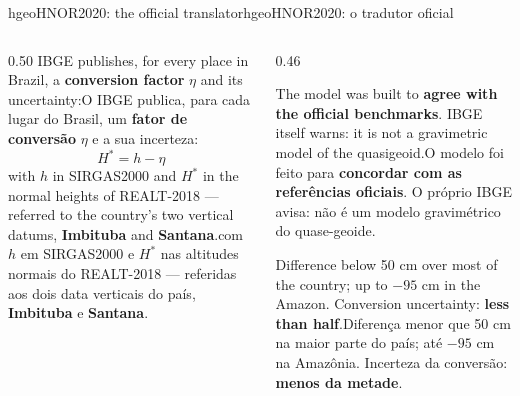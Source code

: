 \documentclass[aspectratio=169,11pt]{beamer}
\newcommand{\tr}[2]{\ifEN#2\else#1\fi}
\newcommand{\bnum}[1]{\textbf{\textcolor{mTeal}{#1}}}
\begin{document}
\begin{frame}{\tr{hgeoHNOR2020: o tradutor oficial}{hgeoHNOR2020: the official translator}}
  \begin{columns}[T]
    \begin{column}{0.50\textwidth}
      \tr{O IBGE publica, para cada lugar do Brasil, um \bnum{fator de conversão} $\eta$ e a
      sua incerteza:}{IBGE publishes, for every place in Brazil, a \bnum{conversion factor}
      $\eta$ and its uncertainty:}
      \[ \boxed{\; H^{*} = h - \eta \;} \]
      \tr{com $h$ em SIRGAS2000 e $H^{*}$ nas altitudes normais do REALT-2018 --- referidas
      aos dois data verticais do país, \bnum{Imbituba} e \bnum{Santana}.}{with $h$ in
      SIRGAS2000 and $H^{*}$ in the normal heights of REALT-2018 --- referred to the country's
      two vertical datums, \bnum{Imbituba} and \bnum{Santana}.}
    \end{column}
    \begin{column}{0.46\textwidth}
      \begin{cuidado}[title={\tr{Um tradutor, não um quase-geoide puro}{A translator, not a pure
        quasigeoid}}]
        \footnotesize\tr{O modelo foi feito para \bnum{concordar com as referências oficiais}. O
        próprio IBGE avisa: não é um modelo gravimétrico do quase-geoide.}{The model was built
        to \bnum{agree with the official benchmarks}. IBGE itself warns: it is not a
        gravimetric model of the quasigeoid.}
      \end{cuidado}
      \smallskip
      \begin{ideia}[title={\tr{Em relação ao MAPGEO2015}{Compared with MAPGEO2015}}]
        \footnotesize\tr{Diferença menor que 50 cm na maior parte do país; até $-95$ cm na Amazônia.
        Incerteza da conversão: \bnum{menos da metade}.}{Difference below 50 cm over most of
        the country; up to $-95$ cm in the Amazon. Conversion uncertainty: \bnum{less than
        half}.}
      \end{ideia}
    \end{column}
  \end{columns}
\end{frame}
\end{document}
